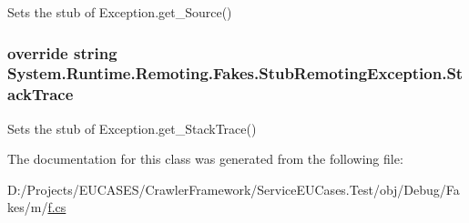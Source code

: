 Sets the stub of Exception.\-get\-\_\-\-Source()

\hypertarget{class_system_1_1_runtime_1_1_remoting_1_1_fakes_1_1_stub_remoting_exception_a80fa87b10d22869907a3af8b2da488e1}{
\subsubsection[{Stack\-Trace}]{\setlength{\rightskip}{0pt plus 5cm}override string System.\-Runtime.\-Remoting.\-Fakes.\-Stub\-Remoting\-Exception.\-Stack\-Trace\hspace{0.3cm}{\ttfamily [get]}}}\label{class_system_1_1_runtime_1_1_remoting_1_1_fakes_1_1_stub_remoting_exception_a80fa87b10d22869907a3af8b2da488e1}


Sets the stub of Exception.\-get\-\_\-\-Stack\-Trace()



The documentation for this class was generated from the following file\-:\begin{DoxyCompactItemize}
\item 
D\-:/\-Projects/\-E\-U\-C\-A\-S\-E\-S/\-Crawler\-Framework/\-Service\-E\-U\-Cases.\-Test/obj/\-Debug/\-Fakes/m/\hyperlink{m_2f_8cs}{f.\-cs}\end{DoxyCompactItemize}
